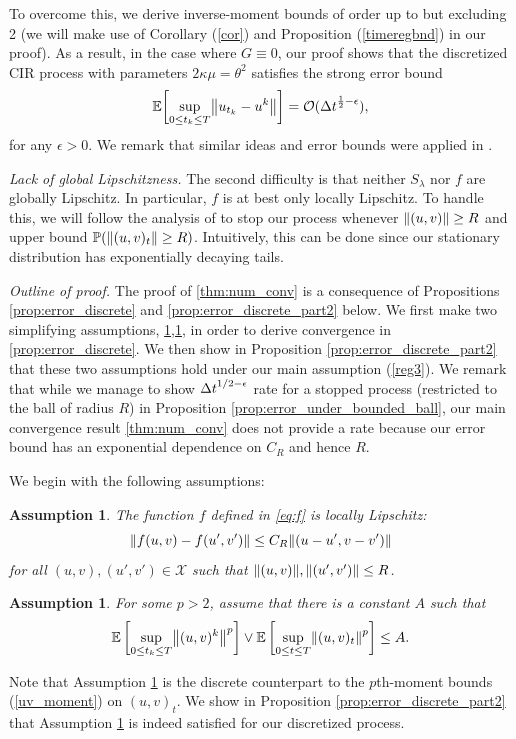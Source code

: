 \documentclass[11pt, twoside]{report}
\newtheorem{assumption}[theorem]{Assumption}
\begin{document}
To overcome this, we derive inverse-moment bounds of order up to but excluding 2 (we will make use of Corollary (\ref{cor}) and Proposition (\ref{timeregbnd}) in our proof). As a result, in the case where $G\equiv 0$, our proof shows that the discretized CIR process with parameters $2\kappa\mu =\theta^2$  satisfies the strong error bound $$\EE\biggl[\sup_{0\leq t_k \leq T} \norm{ u_{t_k} - u^k}\biggr] = \Oo(\deltat^{\frac12-\epsilon}),$$  for any $\epsilon>0$. We remark that similar ideas and error bounds were applied in \cite{hutzenthaler2014strong}.

\textit{Lack of global Lipschitzness.}
The second difficulty is that  neither $S_\lambda$ nor $f$ are globally Lipschitz.  In particular, $f$ is at best only locally Lipschitz. To handle this, we will follow the analysis of \cite{higham2002strong} to stop our process whenever $\left\lVert(u,v)\right\rVert\geq R$ and upper bound $\mathbb{P}(\left\lVert(u,v)_t\right\rVert\geq R)$. Intuitively, this can be done since our stationary distribution has exponentially decaying tails. 

\textit{Outline of proof.}
The proof of \ref{thm:num_conv}  is a consequence of Propositions \ref{prop:error_discrete} and \ref{prop:error_discrete_part2} below. We first make two simplifying assumptions, \ref{ass:ball_R},\ref{ass:2}, in order to derive convergence in \ref{prop:error_discrete}. We then show in Proposition \ref{prop:error_discrete_part2} that these two assumptions hold under our main assumption (\ref{reg3}). 
 We remark that while we manage to show ${\Delta t}^{1/2-\epsilon}$ rate for a stopped process (restricted to the ball of radius $R$) in Proposition \ref{prop:error_under_bounded_ball}, our main convergence result \ref{thm:num_conv} does not provide a rate because our error bound has an exponential dependence on $C_R$ and hence $R$.

 We begin with the following assumptions:
\begin{assumption}\label{ass:ball_R}
The function $f$ defined in \eqref{eq:f} is locally Lipschitz:
$$
\norm{f(u,v) - f(u',v')} \leq  C_R \norm{(u-u', v-v')}
$$
for all $(u,v),(u',v')\in \mathcal X$ such that $\norm{(u,v)}, \norm{(u',v')} \leq R$. 
\end{assumption}
%
\begin{assumption}\label{ass:2}   
For some $p>2$, assume that there is a constant $A$ such that
$$
\EE\left[\sup_{0\le t_k\leq T} \norm{(u,v)^k}^{p}\right] \vee \EE\left[\sup_{0\le t\leq T} \norm{(u,v)_t}^{p}\right] \leq A.
$$
\end{assumption}
Note that Assumption \ref{ass:2} is the discrete counterpart to the $p$th-moment bounds (\ref{uv_moment}) on $(u,v)_t$. We  show in Proposition \ref{prop:error_discrete_part2} that Assumption \ref{ass:2} is indeed satisfied for our discretized process.
\end{document}
